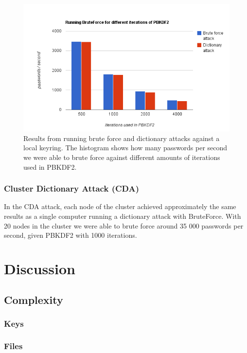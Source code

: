 \documentclass[pdftex,english,10pt,b5paper,twoside]{book}
\begin{document}
\begin{figure}[!h]
\centering
\includegraphics[scale=0.55]{bf.png}
\caption{Results from running brute force and dictionary attacks against a local
keyring. The histogram shows how many passwords per second we were able to brute
force against different amounts of iterations used in PBKDF2.}
\label{fig:bfres}
\end{figure}
\subsection{Cluster Dictionary Attack (CDA)}
In the CDA attack, each node of the cluster achieved approximately the same results as a single computer
running a dictionary attack with BruteForce. With 20 nodes in the cluster we
were able to brute force around 35 000 passwords per second, given PBKDF2 with
1000 iterations.
\chapter{Discussion}
\section{Complexity}


\subsection{Keys}

\subsection{Files}
\end{document}
